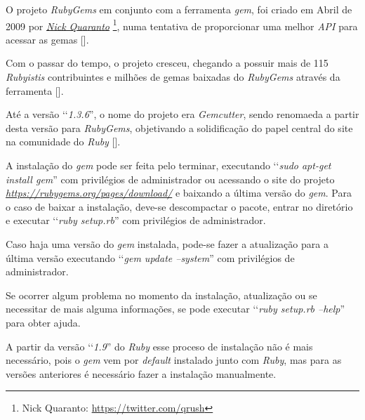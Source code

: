 O projeto \emph{RubyGems} em conjunto com a ferramenta \emph{gem}, foi criado em Abril de 2009 por
\emph{\href{https://twitter.com/qrush}{Nick Quaranto}} \footnote{Nick Quaranto: \url{https://twitter.com/qrush}},
numa tentativa de proporcionar uma melhor \emph{API} para acessar as gemas [].

Com o passar do tempo, o projeto cresceu, chegando a possuir mais de 115 \emph{Rubyistis} contribuintes e
milhões de gemas baixadas do \emph{RubyGems} através da ferramenta [].

Até a versão ‘‘\emph{1.3.6}'', o nome do projeto era \emph{Gemcutter}, sendo renomaeda a partir desta versão
para \emph{RubyGems}, objetivando a solidificação do papel central do site na comunidade do \emph{Ruby}
[].

A instalação do \emph{gem} pode ser feita pelo terminar, executando ‘‘\emph{sudo apt-get install gem}'' com
privilégios de administrador ou acessando o site do projeto
\emph{\href{RubyGems}{https://rubygems.org/pages/download/}} e baixando a última
versão do \emph{gem}. Para o caso de baixar a instalação, deve-se descompactar o pacote, entrar
no diretório e executar ‘‘\emph{ruby setup.rb}'' com privilégios de administrador.

Caso haja uma versão do \emph{gem} instalada, pode-se fazer a atualização para a última versão executando
‘‘\emph{gem update --system}'' com privilégios de administrador.

Se ocorrer algum problema no momento da instalação, atualização ou se necessitar de mais
alguma informações, se pode executar ‘‘\emph{ruby setup.rb --help}'' para obter ajuda.

A partir da versão ‘‘\emph{1.9}'' do \emph{Ruby} esse proceso de instalação não é mais necessário, pois o
\emph{gem} vem por \emph{default} instalado junto com \emph{Ruby}, mas para as versões anteriores
é necessário fazer a instalação manualmente.